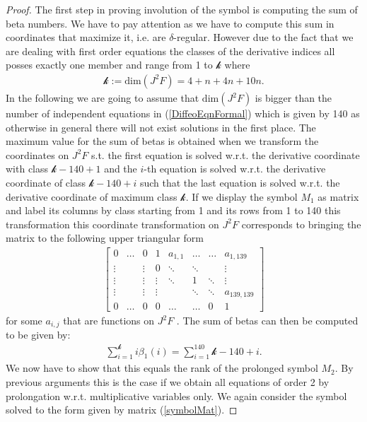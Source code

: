\documentclass[a4paper,12pt, DIV=14, BCOR=5mm, twoside, headsepline]{scrbook}
\begin{document}
\begin{proof}
The first step in proving involution of the symbol is computing the sum of beta numbers. We have to pay attention as we have to compute this sum in coordinates that maximize it, i.e. are $\delta$-regular. However due to the fact that we are dealing with first order equations the classes of the derivative indices all posses exactly one member and range from 1 to $\mathcal{k}$ where 
\begin{align}
    \mathcal{k} := \mathrm{dim}(J^2F) = 4+n+4n+10n.
\end{align}
In the following we are going to assume that $\mathrm{dim}(J^2F)$ is bigger than the number of independent equations in (\ref{DiffeoEqnFormal}) which is given by 140 as otherwise in general there will not exist solutions in the first place. 
The maximum value for the sum of betas is obtained when we transform the coordinates on $J^2F$ s.t. the first equation is solved w.r.t. the derivative coordinate with class $\mathcal{k}-140+1$ and the $i$-th equation is solved w.r.t. the derivative coordinate of class $\mathcal{k}-140+i$ such that the last equation is solved w.r.t. the derivative coordinate of maximum class $\mathcal{k}$. If we display the symbol $M_1$ as matrix and label its columns by class starting from 1 and its rows from 1 to 140 this transformation this coordinate transformation on $J^2F$ corresponds to bringing the matrix to the following upper triangular form
\begin{align}\label{symbolMat}
\begin{bmatrix} 
      0 & \hdots & 0 & 1 & a_{1,1} & \hdots & \hdots & a_{1,139} \\
      \vdots &  & \vdots & 0 & \ddots & \ddots & & \vdots  \\
      \vdots & & \vdots & \vdots & \ddots  & 1 & \ddots & \vdots  \\
      \vdots & & \vdots & \vdots & & \ddots & \ddots & a_{139,139} \\
      0 & \hdots & 0 & 0 & \hdots  & \hdots & 0 & 1
\end{bmatrix}
\end{align}
for some $a_{i,j}$ that are functions on $J^2F$ . The sum of betas can then be computed to be given by:
\begin{align}
    \sum_{i=1}^{\mathcal{k}} i \beta_1(i) = \sum_{i = 1}^{140} \mathcal{k} -140+i.
\end{align}
We now have to show that this equals the rank of the prolonged symbol $M_2$. By previous arguments this is the case if we obtain all equations of order 2 by prolongation w.r.t. multiplicative variables only. We again consider the symbol solved to the form given by matrix (\ref{symbolMat}). 

\end{proof}
\end{document}
